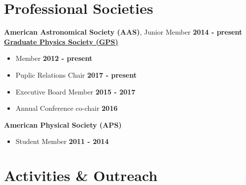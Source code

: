 \documentclass[margin]{res}
\begin{document}
\begin{resume}
\section{Professional Societies}
{\bf American Astronomical Society (AAS)}, Junior Member  \hfill {\bf 2014 - present}\\
\textbf{\href{gradphysics.nd.edu}{Graduate Physics Society (GPS)}}%
\begin{itemize}\itemsep -2pt
    \item[] Member \hfill {\bf 2012 - present}
    \item[] Puplic Relations Chair \hfill {\bf 2017 - present}
    \item[] Executive Board Member \hfill {\bf 2015 - 2017}
    \item[] Annual Conference co-chair \hfill {\bf 2016}
\end{itemize} \vspace{-12pt}
{\bf American Physical Society (APS)}
\begin{itemize}\itemsep -2pt
    \item[] Student Member  \hfill {\bf 2011 - 2014}
\end{itemize} \vspace{-2pt}




\section{Activities \& Outreach} %


\end{resume}
\end{document}
